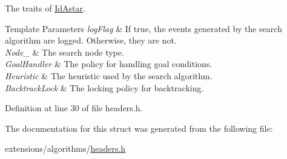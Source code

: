 The traits of \hyperlink{structIdAstar}{Id\+Astar}. 


\begin{DoxyTemplParams}{Template Parameters}
{\em log\+Flag} & If {\ttfamily true}, the events generated by the search algorithm are logged. Otherwise, they are not. \\
\hline
{\em Node\+\_\+} & The search node type. \\
\hline
{\em Goal\+Handler} & The policy for handling goal conditions. \\
\hline
{\em Heuristic} & The heuristic used by the search algorithm. \\
\hline
{\em Backtrack\+Lock} & The locking policy for backtracking. \\
\hline
\end{DoxyTemplParams}


Definition at line 30 of file headers.\+h.



The documentation for this struct was generated from the following file\+:\begin{DoxyCompactItemize}
\item 
extensions/algorithms/\hyperlink{extensions_2algorithms_2headers_8h}{headers.\+h}\end{DoxyCompactItemize}
